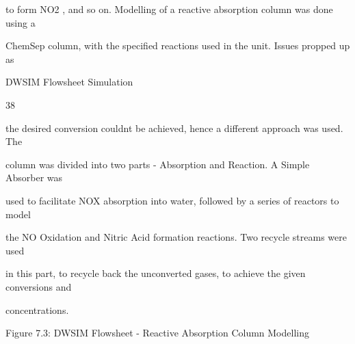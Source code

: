 \documentclass[a4paper,portrait,12pt]{article}
\begin{document}
\begin{flushleft}
to form NO2 , and so on. Modelling of a reactive absorption column was done using a
\end{flushleft}


\begin{flushleft}
ChemSep column, with the specified reactions used in the unit. Issues propped up as
\end{flushleft}





\begin{flushleft}
\newpage
DWSIM Flowsheet Simulation
\end{flushleft}





38





\begin{flushleft}
the desired conversion couldnt be achieved, hence a different approach was used. The
\end{flushleft}


\begin{flushleft}
column was divided into two parts - Absorption and Reaction. A Simple Absorber was
\end{flushleft}


\begin{flushleft}
used to facilitate NOX absorption into water, followed by a series of reactors to model
\end{flushleft}


\begin{flushleft}
the NO Oxidation and Nitric Acid formation reactions. Two recycle streams were used
\end{flushleft}


\begin{flushleft}
in this part, to recycle back the unconverted gases, to achieve the given conversions and
\end{flushleft}


\begin{flushleft}
concentrations.
\end{flushleft}





\begin{flushleft}
Figure 7.3: DWSIM Flowsheet - Reactive Absorption Column Modelling
\end{flushleft}
\end{document}
